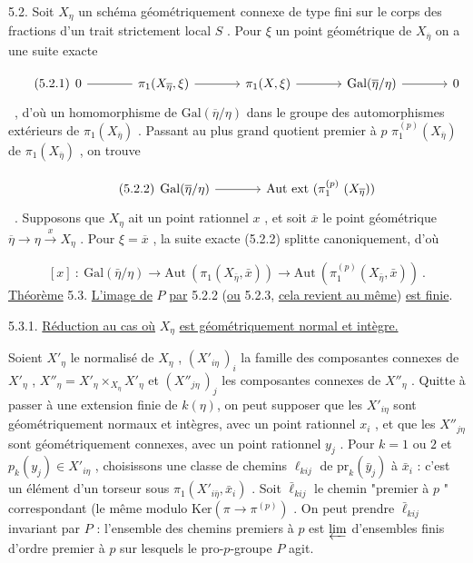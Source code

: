 5.2.  Soit  $X_\eta$  un schéma géométriquement connexe de type fini sur le corps des fractions d'un trait strictement local  $S$ . Pour  $\xi$  un point géométrique de  $X_{\overline{\eta}}$  on a une suite exacte

\begin{equation}\tag{5.2.1}
\begin{tikzcd}[column sep=large, row sep=tiny]
0 \arrow[r, dash] & \pi_1(X_{\overline{\eta}},\xi) \arrow[r] & \pi_1(X,\xi) \arrow[r] & \mathrm{Gal}(\overline{\eta}/\eta) \arrow[r] & 0
\end{tikzcd}
\end{equation}\ ,
d'où un homomorphisme de  $\mathrm{Gal}(\overline{\eta}/\eta)$  dans le groupe des automorphismes extérieurs de $\pi_1(X_{\overline{\eta}})$ . Passant au plus grand quotient premier à  $p$  $\pi_1^{(p)}(X_{\overline{\eta}})$  de  $\pi_1(X_{\overline{\eta}})$ , on trouve

\begin{equation}\tag{5.2.2}
\begin{tikzcd}[column sep=large, row sep=tiny]
\mathrm{Gal}(\overline{\eta}/\eta) \arrow[r] & \mathrm{Aut}\ \mathrm{ext}\ (\pi_1^{(p)}\ (X_{\overline{\eta}}))
\end{tikzcd}
\end{equation}\ .
Supposons que  $X_\eta$  ait un point rationnel  $x$ , et soit  $\overline{x}$  le point géométrique  $\overline{\eta} \longrightarrow \eta \xrightarrow{\ x\ } X_\eta$ . Pour  $\xi = \overline{x}$ , la suite exacte (5.2.2) splitte canoniquement, d'où



\begin{equation}\tag{5.2.3}
[x] \ : \ \mathrm{Gal}(\bar{\eta}/\eta) \longrightarrow \mathrm{Aut}\ (\pi_1(X_{\bar{\eta}},\bar{x})) \longrightarrow \mathrm{Aut}\ (\pi_1^{(p)}(X_{\bar{\eta}},\bar{x}))\ .
\end{equation}
\underline{Théorème} 5.3. \underline{L'image de} $P$ \underline{par} 5.2.2 (\underline{ou} 5.2.3, \underline{cela revient au même}) \underline{est finie}.


5.3.1. \underline{Réduction au cas où} $X_\eta$ \underline{est géométriquement normal et intègre.}

Soient $X'_\eta$ le normalisé de $X_\eta$ , $(X'_{i\eta}\,)_i$ la famille des composantes connexes de $X'_\eta$ , $X''_\eta = X'_\eta \times_{X_\eta} X'_\eta$ et $(X''_{j\eta}\,)_j$ les composantes connexes de $X''_\eta$ . Quitte à passer à une extension finie de $k(\eta)$, on peut supposer que les $X'_{i\eta}$ sont géométriquement normaux et intègres, avec un point rationnel $x_i$ , et que les $X''_{j\eta}$ sont géométriquement connexes, avec un point rationnel $y_j$ . Pour $k = 1$ ou $2$ et $p_k(y_j) \in X'_{i\eta}$ , choisissons une classe de chemins $\ell_{kij}$ de $\mathrm{pr}_k(\bar{y}_j)$ à $\bar{x}_i$ : c'est un élément d'un torseur sous $\pi_1(X'_{i\bar{\eta}},\bar{x}_i)$ . Soit $\bar{\ell}_{kij}$ le chemin "premier à $p$ " correspondant (le même modulo $\mathrm{Ker}(\pi \longrightarrow \pi^{(p)})$ . On peut prendre $\bar{\ell}_{kij}$ invariant par $P$ : l'ensemble des chemins premiers à $p$ est $\varprojlim$ d'ensembles finis d'ordre premier à $p$ sur lesquels le pro-$p$-groupe $P$ agit.

